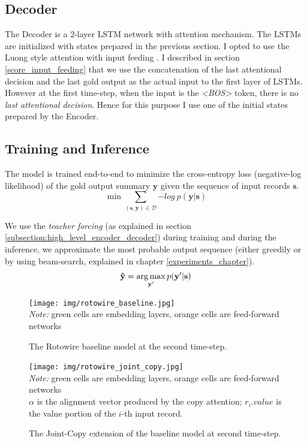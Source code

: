 \subsection{Decoder}

The Decoder is a 2-layer LSTM network with attention mechanism. The LSTMs are initialized with states prepared in the previous section. I opted to use the Luong style attention with input feeding \citep{luong2015effective}. I described in section \ref{score_input_feeding} that we use the concatenation of the last attentional decision and the last gold output as the actual input to the first layer of LSTMs. However at the first time-step, when the input is the \emph{\textless BOS\textgreater} token, there is no \emph{last attentional decision}. Hence for this purpose I use one of the initial states prepared by the Encoder.

\subsection{Training and Inference}

The model is trained end-to-end to minimize the cross-entropy loss (negative-log likelihood) of the gold output summary $\mathbf{y}$ given the sequence of input records $\mathbf{s}$.
\begin{equation}
    \min \sum_{(\mathbf{s}, \mathbf{y}) \in \mathcal{D} }{-log\ p(\mathbf{y}|\mathbf{s})}
\end{equation}

We use the \emph{teacher forcing} (as explained in section \ref{subsection:high_level_encoder_decoder}) during training and during the inference, we approximate the most probable output sequence (either greedily or by using beam-search, explained in chapter \ref{experiments_chapter}).
\begin{equation}
    \mathbf{\hat{y}} = \operatorname*{arg\,max}_{\mathbf{y'}} p(\mathbf{y'} | \mathbf{s})
\end{equation}

\begin{figure}[!h]
    \centering
    \texttt{[image: img/rotowire\_baseline.jpg]}
    \footnotesize{\\ \textit{Note:} green cells are embedding layers, orange cells are feed-forward networks}
    \caption{\centering The Rotowire baseline model at the second time-step.} \label{rotowire_baseline_vis}
\end{figure}

\begin{figure}[!h]
    \centering
    \texttt{[image: img/rotowire\_joint\_copy.jpg]}
    \footnotesize{\\ \textit{Note:} green cells are embedding layers, orange cells are feed-forward networks \\ $\alpha$ is the alignment vector produced by the copy attention; $r_i.value$ is the value portion of the $i$-th input record.}
    \caption{\centering The Joint-Copy extension of the baseline model at second time-step.} \label{rotowire_joint_copy_vis}
\end{figure}

